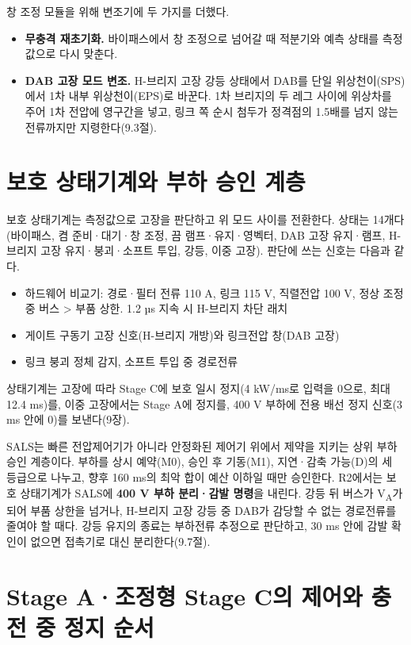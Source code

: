 창 조정 모듈을 위해 변조기에 두 가지를 더했다.

\begin{itemize}
\item \textbf{무충격 재초기화.} 바이패스에서 창 조정으로 넘어갈 때 적분기와 예측 상태를 측정값으로 다시 맞춘다.
\item \textbf{DAB 고장 모드 변조.} H-브리지 고장 강등 상태에서 DAB를 단일 위상천이(SPS)에서 1차 내부 위상천이(EPS)\cite{b2}로 바꾼다. 1차 브리지의 두 레그 사이에 위상차를 주어 1차 전압에 영구간을 넣고, 링크 쪽 순시 첨두가 정격점의 1.5배를 넘지 않는 전류까지만 지령한다(9.3절).
\end{itemize}

\section{보호 상태기계와 부하 승인 계층}

보호 상태기계는 측정값으로 고장을 판단하고 위 모드 사이를 전환한다. 상태는 14개다(바이패스, 켬 준비·대기·창 조정, 끔 램프·유지·영벡터, DAB 고장 유지·램프, H-브리지 고장 유지·붕괴·소프트 투입, 강등, 이중 고장). 판단에 쓰는 신호는 다음과 같다.

\begin{itemize}
\item 하드웨어 비교기: 경로·필터 전류 110 A, 링크 115 V, 직렬전압 100 V, 정상 조정 중 버스 > 부품 상한. 1.2 µs 지속 시 H-브리지 차단 래치
\item 게이트 구동기 고장 신호(H-브리지 개방)와 링크전압 창(DAB 고장)
\item 링크 붕괴 정체 감지, 소프트 투입 중 경로전류
\end{itemize}

상태기계는 고장에 따라 Stage C에 보호 일시 정지(4 kW/ms로 입력을 0으로, 최대 12.4 ms)를, 이중 고장에서는 Stage A에 정지를, 400 V 부하에 전용 배선 정지 신호(3 ms 안에 0)를 보낸다(9장).

SALS는 빠른 전압제어기가 아니라 안정화된 제어기 위에서 제약을 지키는 상위 부하 승인 계층이다\cite{b8}. 부하를 상시 예약(M0), 승인 후 기동(M1), 지연·감축 가능(D)의 세 등급으로 나누고, 향후 160 ms의 최악 합이 예산 이하일 때만 승인한다. R2에서는 보호 상태기계가 SALS에 \textbf{400 V 부하 분리·감발 명령}을 내린다. 강등 뒤 버스가 V\textsubscript{A}가 되어 부품 상한을 넘거나, H-브리지 고장 강등 중 DAB가 감당할 수 없는 경로전류를 줄여야 할 때다. 강등 유지의 종료는 부하전류 추정으로 판단하고, 30 ms 안에 감발 확인이 없으면 접촉기로 대신 분리한다(9.7절).

\section{Stage A·조정형 Stage C의 제어와 충전 중 정지 순서}

